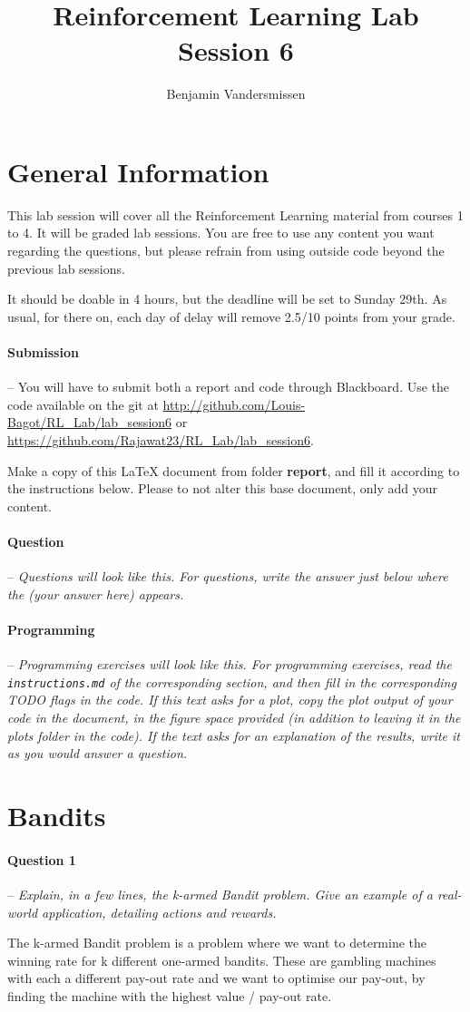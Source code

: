 \documentclass[a4paper]{article}
\title{Reinforcement Learning Lab Session 6}
\author{Benjamin Vandersmissen}
\newcommand{\question}[2]{
\paragraph{Question #1} -- \textit{#2}

}
\newcommand{\programming}[1]{
\paragraph{Programming} -- \textit{#1}

}
\begin{document}
\maketitle
\section*{General Information}
This lab session will cover all the Reinforcement Learning material from courses 1 to 4. It will be graded lab sessions. You are free to use any content you want regarding the questions, but please refrain from using outside code beyond the previous lab sessions.

It should be doable in 4 hours, but the deadline will be set to Sunday 29th. As usual, for there on, each day of delay will remove 2.5/10 points from your grade.

\paragraph{Submission} --
You will have to submit both a report and code through Blackboard. Use the code available on the git at \url{http://github.com/Louis-Bagot/RL_Lab/lab_session6} or \url{https://github.com/Rajawat23/RL_Lab/lab_session6}.

Make a copy of this LaTeX document from folder \textbf{report}, and fill it according to the instructions below. Please to not alter this base document, only add your content.

\question{}{Questions will look like this. For questions, write the answer just below where the (your answer here) appears.}
\programming{Programming exercises will look like this. For programming exercises, read the \texttt{instructions.md} of the corresponding section, and then fill in the corresponding TODO flags in the code. If this text asks for a plot, copy the plot output of your code in the document, in the figure space provided (in addition to leaving it in the plots folder in the code). If the text asks for an explanation of the results, write it as you would answer a question.}

\tableofcontents
\newpage

\section{Bandits}
\question{1}{Explain, in a few lines, the k-armed Bandit problem. Give an example of a real-world application, detailing actions and rewards.}
The k-armed Bandit problem is a problem where we want to determine the winning rate for k different one-armed bandits. These are gambling machines with each a different pay-out rate and we want to optimise our pay-out, by finding the machine with the highest value / pay-out rate. \\
\end{document}
